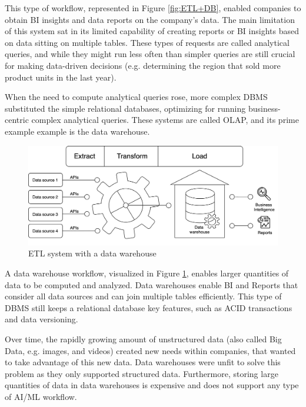 This type of workflow, represented in Figure \ref{fig:ETL+DB}, enabled companies to obtain \gls{BI} insights and data reports on the company's data. The main limitation of this system sat in its limited capability of creating reports or \gls{BI} insights based on data sitting on multiple tables. These types of requests are called analytical queries, and while they might run less often than simpler queries are still crucial for making data-driven decisions (e.g. determining the region that sold more product units in the last year).

When the need to compute analytical queries rose, more complex \gls{DBMS} substituted the simple relational databases, optimizing for running business-centric complex analytical queries. These systems are called \gls{OLAP}, and its prime example example is the data warehouse.

\begin{figure}[!ht]
    \begin{center}
      \includegraphics[width=\textwidth]{figures/2-background/DeltaLake_evolution-ETL+DW.png}
    \end{center}
    \caption{\gls{ETL} system with a data warehouse}
    \label{fig:ETL+DW}
\end{figure}

A data warehouse workflow, visualized in Figure \ref{fig:ETL+DW}, enables larger quantities of data to be computed and analyzed. Data warehouses enable \gls{BI} and Reports that consider all data sources and can join multiple tables efficiently. This type of \gls{DBMS} still keeps a relational database key features, such as \gls{ACID} transactions and data versioning.

Over time, the rapidly growing amount of unstructured data (also called Big Data, e.g. images, and videos) created new needs within companies, that wanted to take advantage of this new data. Data warehouses were unfit to solve this problem as they only supported structured data. Furthermore, storing large quantities of data in data warehouses is expensive and does not support any type of \gls{AI}/\gls{ML} workflow.

